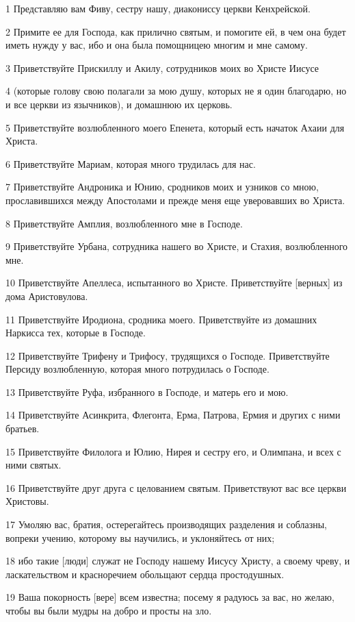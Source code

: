 \par 1 Представляю вам Фиву, сестру нашу, диакониссу церкви Кенхрейской.
\par 2 Примите ее для Господа, как прилично святым, и помогите ей, в чем она будет иметь нужду у вас, ибо и она была помощницею многим и мне самому.
\par 3 Приветствуйте Прискиллу и Акилу, сотрудников моих во Христе Иисусе
\par 4 (которые голову свою полагали за мою душу, которых не я один благодарю, но и все церкви из язычников), и домашнюю их церковь.
\par 5 Приветствуйте возлюбленного моего Епенета, который есть начаток Ахаии для Христа.
\par 6 Приветствуйте Мариам, которая много трудилась для нас.
\par 7 Приветствуйте Андроника и Юнию, сродников моих и узников со мною, прославившихся между Апостолами и прежде меня еще уверовавших во Христа.
\par 8 Приветствуйте Амплия, возлюбленного мне в Господе.
\par 9 Приветствуйте Урбана, сотрудника нашего во Христе, и Стахия, возлюбленного мне.
\par 10 Приветствуйте Апеллеса, испытанного во Христе. Приветствуйте [верных] из дома Аристовулова.
\par 11 Приветствуйте Иродиона, сродника моего. Приветствуйте из домашних Наркисса тех, которые в Господе.
\par 12 Приветствуйте Трифену и Трифосу, трудящихся о Господе. Приветствуйте Персиду возлюбленную, которая много потрудилась о Господе.
\par 13 Приветствуйте Руфа, избранного в Господе, и матерь его и мою.
\par 14 Приветствуйте Асинкрита, Флегонта, Ерма, Патрова, Ермия и других с ними братьев.
\par 15 Приветствуйте Филолога и Юлию, Нирея и сестру его, и Олимпана, и всех с ними святых.
\par 16 Приветствуйте друг друга с целованием святым. Приветствуют вас все церкви Христовы.
\par 17 Умоляю вас, братия, остерегайтесь производящих разделения и соблазны, вопреки учению, которому вы научились, и уклоняйтесь от них;
\par 18 ибо такие [люди] служат не Господу нашему Иисусу Христу, а своему чреву, и ласкательством и красноречием обольщают сердца простодушных.
\par 19 Ваша покорность [вере] всем известна; посему я радуюсь за вас, но желаю, чтобы вы были мудры на добро и просты на зло.
